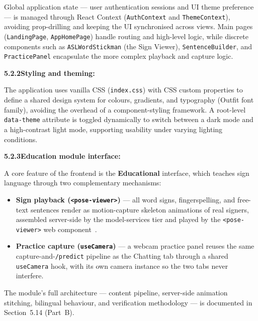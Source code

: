 \noindent Global application state --- user authentication sessions and UI theme preference --- is managed through React Context (\texttt{AuthContext} and \texttt{ThemeContext}), avoiding prop-drilling and keeping the UI synchronised across views. Main pages (\texttt{LandingPage}, \texttt{AppHomePage}) handle routing and high-level logic, while discrete components such as \texttt{ASLWordStickman} (the Sign Viewer), \texttt{SentenceBuilder}, and \texttt{PracticePanel} encapsulate the more complex playback and capture logic.\par\vspace{0.2cm}

\noindent\textbf{5.2.2\quad Styling and theming:}\par
{}
\vspace{0.2cm}

\noindent The application uses vanilla CSS (\texttt{index.css}) with CSS custom properties to define a shared design system for colours, gradients, and typography (Outfit font family), avoiding the overhead of a component-styling framework. A root-level \texttt{data-theme} attribute is toggled dynamically to switch between a dark mode and a high-contrast light mode, supporting usability under varying lighting conditions.\par\vspace{0.2cm}

\clearpage
\noindent\textbf{5.2.3\quad Education module interface:}\par
{}
\vspace{0.2cm}

\noindent A core feature of the frontend is the \textbf{Educational} interface, which teaches sign language through two complementary mechanisms:
\begin{itemize}
\item \textbf{Sign playback (\texttt{<pose-viewer>})} --- all word signs, fingerspelling, and free-text sentences render as motion-capture skeleton animations of real signers, assembled server-side by the model-services tier and played by the \texttt{<pose-viewer>} web component~\cite{signmt2023,poseformat}.
\item \textbf{Practice capture (\texttt{useCamera})} --- a webcam practice panel reuses the same capture-and-\texttt{/predict} pipeline as the Chatting tab through a shared \texttt{useCamera} hook, with its own camera instance so the two tabs never interfere.
\end{itemize}
The module's full architecture --- content pipeline, server-side animation stitching, bilingual behaviour, and verification methodology --- is documented in Section~5.14 (Part~B).
\vspace{0.2cm}

